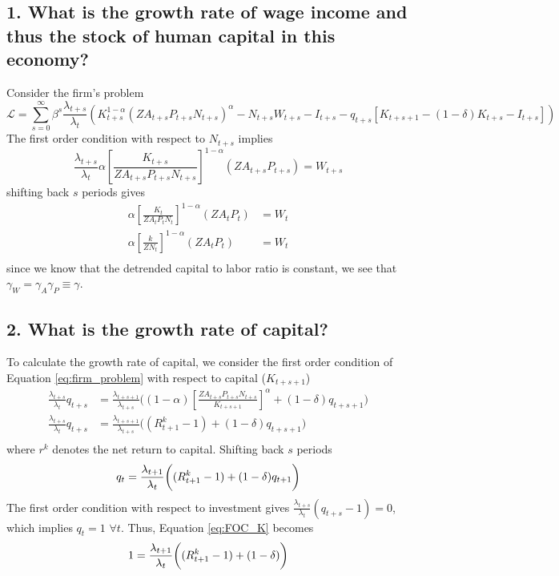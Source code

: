 \documentclass[10pt,letter]{article}
\begin{document}
\subsection*{1. What is the growth rate of wage income and thus the stock of human capital in this economy?}
Consider the firm's problem 
\begin{equation}
	\mathcal{L} = \sum_{s = 0}^{\infty}\beta^s \frac{\lambda_{t+s}}{\lambda_t}\left(K_{t+s}^{1-\alpha}(ZA_{t+s}P_{t+s}N_{t+s})^\alpha -  N_{t+s}W_{t+s} - I_{t+s} - q_{t+s}\left[K_{t+s+1}-(1-\delta)K_{t+s}-I_{t+s}\right]\right)
	\label{eq:firm_problem}
\end{equation}
The first order condition with respect to $N_{t+s}$ implies 
\begin{equation*}
	\frac{\lambda_{t+s}}{\lambda_t} \alpha\left[ \frac{K_{t+s}}{ZA_{t+s}P_{t+s}N_{t+s}}\right]^{1-\alpha} (ZA_{t+s}P_{t+s}) = W_{t+s}
\end{equation*}
shifting back $s$ periods gives 
\begin{equation*}
\begin{split}
		 \alpha\left[ \frac{K_{t}}{ZA_{t}P_{t}N_{t}}\right]^{1-\alpha} (ZA_{t}P_{t}) &= W_{t}\\
		 \alpha\left[ \frac{k}{ZN_{t}}\right]^{1-\alpha} (ZA_{t}P_{t}) &= W_{t}\\
\end{split}
\end{equation*}
since we know that the detrended capital to labor ratio is constant, we see that $\gamma_W = \gamma_A \gamma_P \equiv \gamma$. 
\subsection*{2. What is the growth rate of capital?}
To calculate the growth rate of capital, we consider the first order condition of Equation \ref{eq:firm_problem} with respect to capital ($K_{t+s+1}$)
\begin{equation*}
\begin{split}
	\frac{\lambda_{t+s}}{\lambda_t}q_{t+s} &= \frac{\lambda_{t+s+1}}{\lambda_{t+s}}\bigg((1-\alpha)\left[\frac{ZA_{t+s}P_{t+s}N_{t+s}}{K_{t+s+1}}\right]^\alpha + (1-\delta) q_{t+s+1}\bigg)\\
	\frac{\lambda_{t+s}}{\lambda_t}q_{t+s} &= \frac{\lambda_{t+s+1}}{\lambda_{t+s}}\bigg((R^k_{t+1}-1) + (1-\delta) q_{t+s+1}\bigg)\\
\end{split}
\end{equation*}
where $r^k$ denotes the net return to capital. Shifting back $s$ periods 
\begin{equation*}
	q_{t} = \frac{\lambda_{t+1}}{\lambda_{t}}\bigg((R^k_{t+1}-1) + (1-\delta) q_{t+1}\bigg)\\
	\label{eq:FOC_K}
\end{equation*}
The first order condition with respect to investment gives $\frac{\lambda_{t+s}}{\lambda_t}(q_{t+s}-1) = 0$, which implies $q_t = 1$ $\forall t$. Thus, Equation \ref{eq:FOC_K} becomes 
\begin{equation*}
1 = \frac{\lambda_{t+1}}{\lambda_{t}}\bigg((R^k_{t+1}-1) + (1-\delta)\bigg)\\
\end{equation*}
\end{document}
